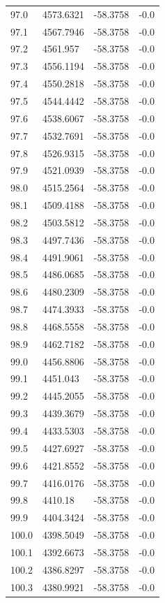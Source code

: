 \begin{table}[H]
\begin{tabular}{llll}
97.0 & 4573.6321 & -58.3758 & -0.0 \\
97.1 & 4567.7946 & -58.3758 & -0.0 \\
97.2 & 4561.957 & -58.3758 & -0.0 \\
97.3 & 4556.1194 & -58.3758 & -0.0 \\
97.4 & 4550.2818 & -58.3758 & -0.0 \\
97.5 & 4544.4442 & -58.3758 & -0.0 \\
97.6 & 4538.6067 & -58.3758 & -0.0 \\
97.7 & 4532.7691 & -58.3758 & -0.0 \\
97.8 & 4526.9315 & -58.3758 & -0.0 \\
97.9 & 4521.0939 & -58.3758 & -0.0 \\
98.0 & 4515.2564 & -58.3758 & -0.0 \\
98.1 & 4509.4188 & -58.3758 & -0.0 \\
98.2 & 4503.5812 & -58.3758 & -0.0 \\
98.3 & 4497.7436 & -58.3758 & -0.0 \\
98.4 & 4491.9061 & -58.3758 & -0.0 \\
98.5 & 4486.0685 & -58.3758 & -0.0 \\
98.6 & 4480.2309 & -58.3758 & -0.0 \\
98.7 & 4474.3933 & -58.3758 & -0.0 \\
98.8 & 4468.5558 & -58.3758 & -0.0 \\
98.9 & 4462.7182 & -58.3758 & -0.0 \\
99.0 & 4456.8806 & -58.3758 & -0.0 \\
99.1 & 4451.043 & -58.3758 & -0.0 \\
99.2 & 4445.2055 & -58.3758 & -0.0 \\
99.3 & 4439.3679 & -58.3758 & -0.0 \\
99.4 & 4433.5303 & -58.3758 & -0.0 \\
99.5 & 4427.6927 & -58.3758 & -0.0 \\
99.6 & 4421.8552 & -58.3758 & -0.0 \\
99.7 & 4416.0176 & -58.3758 & -0.0 \\
99.8 & 4410.18 & -58.3758 & -0.0 \\
99.9 & 4404.3424 & -58.3758 & -0.0 \\
100.0 & 4398.5049 & -58.3758 & -0.0 \\
100.1 & 4392.6673 & -58.3758 & -0.0 \\
100.2 & 4386.8297 & -58.3758 & -0.0 \\
100.3 & 4380.9921 & -58.3758 & -0.0 \\

\end{tabular}
\end{table}
